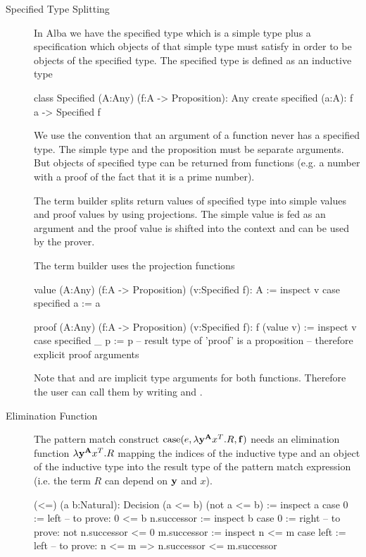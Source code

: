 \begin{description}
\item[Specified Type Splitting]
  In Alba we have the specified type which is a simple type plus a
  specification which objects of that simple type must satisfy in order to be
  objects of the specified type. The specified type is defined as an inductive
  type
  \begin{alba}
    class Specified (A:Any) (f:A -> Proposition): Any create
      specified (a:A): f a -> Specified f
  \end{alba}
  We use the convention that an argument of a function never has a specified
  type. The simple type and the proposition must be separate arguments. But
  objects of specified type can be returned from functions (e.g. a number with
  a proof of the fact that it is a prime number).

  The term builder splits return values of specified type into simple values
  and proof values by using projections. The simple value is fed as an
  argument and the proof value is shifted into the context and can be used by
  the prover.

  The term builder uses the projection functions
  \begin{alba}
     value (A:Any) (f:A -> Proposition) (v:Specified f): A :=
       inspect v case
         specified a := a

     proof (A:Any) (f:A -> Proposition) (v:Specified f): f (value v) :=
       inspect v case
         specified _ p := p   -- result type of 'proof' is a proposition
                              -- therefore explicit proof arguments
  \end{alba}
  Note that  and  are implicit type arguments for both
  functions. Therefore the user can call them by writing  and
  .


\item[Elimination Function]
  The pattern match construct
  $\text{case}(e, \lambda \mathbf{y}^{\mathbf{A}} x^T . R, \mathbf{f})$ needs an elimination
  function $\lambda \mathbf{y}^{\mathbf{A}} x^T . R$ mapping the indices of the
  inductive type and an object of the inductive type into the result type of
  the pattern match expression (i.e. the term $R$ can depend on $\mathbf{y}$ and
  $x$).
  \begin{alba}
     (<=) (a b:Natural): Decision (a <= b) (not a <= b) :=
        inspect a case
          0 :=
            left                 -- to prove: 0 <= b
          n.successor :=
            inspect b case
              0 :=
                right            -- to prove: not n.successor <= 0
              m.successor :=
                inspect n <= m case
                  left  := left
                    -- to prove: n <= m => n.successor <= m.successor


\end{alba}
\end{description}

